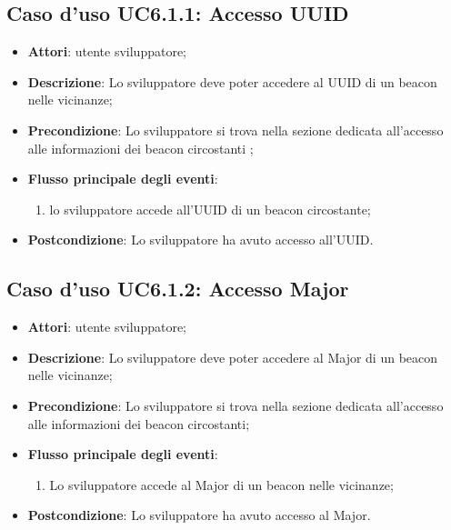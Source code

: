 \documentclass[../AnalisiDeiRequisiti.tex]{subfiles}
\begin{document}
\subsection{Caso d'uso UC6.1.1: Accesso UUID}
\begin{itemize}
\item \textbf{Attori}: utente sviluppatore;
\item \textbf{Descrizione}: Lo sviluppatore deve poter accedere al UUID di un beacon nelle vicinanze; 
      \item \textbf{Precondizione}: Lo sviluppatore si trova nella sezione dedicata all'accesso alle informazioni dei beacon circostanti ;

        \item \textbf{Flusso principale degli eventi}:
          \begin{enumerate}
          \item lo sviluppatore accede all'UUID di un beacon circostante;

      \end{enumerate}
    \item \textbf{Postcondizione}: Lo sviluppatore ha avuto accesso all'UUID.
  \end{itemize}
\hypertarget{UC6.1.2}{}
\subsection{Caso d'uso UC6.1.2: Accesso Major}

\begin{itemize}
\item \textbf{Attori}: utente sviluppatore;
\item \textbf{Descrizione}: Lo sviluppatore deve poter accedere al Major di un beacon nelle vicinanze; 
      \item \textbf{Precondizione}: Lo sviluppatore si trova nella sezione dedicata all'accesso alle informazioni dei beacon circostanti;

        \item \textbf{Flusso principale degli eventi}:
          \begin{enumerate}
          \item Lo sviluppatore accede al Major di un beacon nelle vicinanze;

      \end{enumerate}
    \item \textbf{Postcondizione}: Lo sviluppatore ha avuto accesso al Major.
  \end{itemize}
\hypertarget{UC6.1.3}{}
\end{document}

